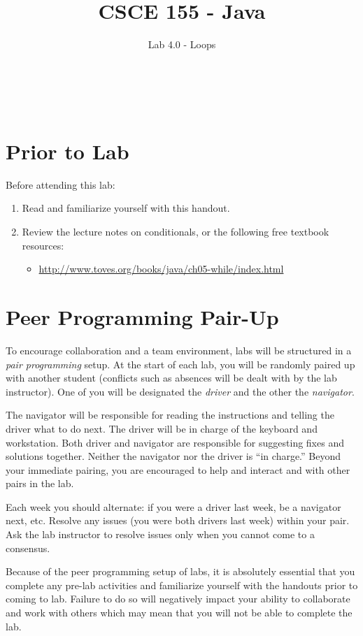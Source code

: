 \documentclass[12pt]{scrartcl}
\title{CSCE 155 - Java}
\subtitle{Lab 4.0 - Loops}
\author{~}
\date{~}
\begin{document}
\maketitle

\section*{Prior to Lab}

Before attending this lab:
\begin{enumerate}
  \item Read and familiarize yourself with this handout.
  \item Review the lecture notes on conditionals, or the following free textbook resources:
	\begin{itemize}
  	  \item \url{http://www.toves.org/books/java/ch05-while/index.html}
	\end{itemize}
\end{enumerate}

\section*{Peer Programming Pair-Up}

To encourage collaboration and a team environment, labs will be
structured in a \emph{pair programming} setup.  At the start of
each lab, you will be randomly paired up with another student 
(conflicts such as absences will be dealt with by the lab instructor).
One of you will be designated the \emph{driver} and the other
the \emph{navigator}.  

The navigator will be responsible for reading the instructions and
telling the driver what to do next.  The driver will be in charge of the
keyboard and workstation.  Both driver and navigator are responsible
for suggesting fixes and solutions together.  Neither the navigator
nor the driver is ``in charge.''  Beyond your immediate pairing, you
are encouraged to help and interact and with other pairs in the lab.

Each week you should alternate: if you were a driver last week, 
be a navigator next, etc.  Resolve any issues (you were both drivers
last week) within your pair.  Ask the lab instructor to resolve issues
only when you cannot come to a consensus.  

Because of the peer programming setup of labs, it is absolutely 
essential that you complete any pre-lab activities and familiarize
yourself with the handouts prior to coming to lab.  Failure to do
so will negatively impact your ability to collaborate and work with 
others which may mean that you will not be able to complete the
lab.  
\end{document}
